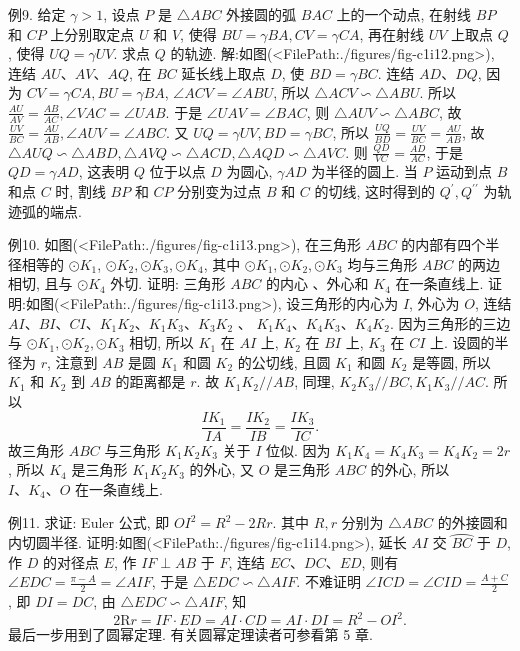 例9. 给定 $\gamma>1$, 设点 $P$ 是 $\triangle A B C$ 外接圆的弧 $B A C$ 上的一个动点, 在射线 $B P$ 和 $C P$ 上分别取定点 $U$ 和 $V$, 使得 $B U=\gamma B A, C V=\gamma C A$, 再在射线 $U V$ 上取点 $Q$, 使得 $U Q=\gamma U V$. 求点 $Q$ 的轨迹.
解:如图(<FilePath:./figures/fig-c1i12.png>), 连结 $A U 、 A V 、 A Q$, 在 $B C$ 延长线上取点 $D$, 使 $B D=\gamma B C$.
连结 $A D 、 D Q$, 因为 $C V=\gamma C A, B U=\gamma B A$, $\angle A C V=\angle A B U$, 所以 $\triangle A C V \backsim \triangle A B U$.
所以 $\frac{A U}{A V}=\frac{A B}{A C}, \angle V A C=\angle U A B$.
于是 $\angle U A V=\angle B A C$, 则 $\triangle A U V \backsim \triangle A B C$, 故 $\frac{U V}{B C}=\frac{A U}{A B}, \angle A U V=\angle A B C$.
又 $U Q=\gamma U V, B D=\gamma B C$, 所以 $\frac{U Q}{B D}=\frac{U V}{B C}= \frac{A U}{A B}$, 故 $\triangle A U Q \backsim \triangle A B D, \triangle A V Q \backsim \triangle A C D, \triangle A Q D \backsim \triangle A V C$.
则 $\frac{Q D}{V C}=\frac{A D}{A C}$, 于是 $Q D=\gamma A D$, 这表明 $Q$ 位于以点 $D$ 为圆心, $\gamma A D$ 为半径的圆上.
当 $P$ 运动到点 $B$ 和点 $C$ 时, 割线 $B P$ 和 $C P$ 分别变为过点 $B$ 和 $C$ 的切线, 这时得到的 $Q^{\prime}, Q^{\prime \prime}$ 为轨迹弧的端点.



例10. 如图(<FilePath:./figures/fig-c1i13.png>), 在三角形 $A B C$ 的内部有四个半径相等的 $\odot K_1$, $\odot K_2, \odot K_3, \odot K_4$, 其中 $\odot K_1, \odot K_2, \odot K_3$ 均与三角形 $A B C$ 的两边相切, 且与 $\odot K_4$ 外切.
证明: 三角形 $A B C$ 的内心 、外心和 $K_4$ 在一条直线上.
证明:如图(<FilePath:./figures/fig-c1i13.png>), 设三角形的内心为 $I$, 外心为 $O$, 连结 $A I 、 B I 、 C I 、 K_1 K_2 、 K_1 K_3 、 K_3 K_2$ 、 $K_1 K_4 、 K_4 K_3 、 K_4 K_2$.
因为三角形的三边与 $\odot K_1, \odot K_2, \odot K_3$ 相切, 所以 $K_1$ 在 $A I$ 上, $K_2$ 在 $B I$ 上, $K_3$ 在 $C I$ 上.
设圆的半径为 $r$, 注意到 $A B$ 是圆 $K_1$ 和圆 $K_2$ 的公切线, 且圆 $K_1$ 和圆 $K_2$ 是等圆, 所以 $K_1$ 和 $K_2$ 到 $A B$ 的距离都是 $r$.
故 $K_1 K_2 / / A B$, 同理, $K_2 K_3 / / B C, K_1 K_3 / / A C$.
所以
$$
\frac{I K_1}{I A}=\frac{I K_2}{I B}=\frac{I K_3}{I C} .
$$
故三角形 $A B C$ 与三角形 $K_1 K_2 K_3$ 关于 $I$ 位似.
因为 $K_1 K_4=K_4 K_3=K_4 K_2=2 r$, 所以 $K_4$ 是三角形 $K_1 K_2 K_3$ 的外心, 又 $O$ 是三角形 $A B C$ 的外心, 所以 $I 、 K_4 、 O$ 在一条直线上.



例11. 求证: Euler 公式, 即 $O I^2=R^2-2 R r$. 其中 $R, r$ 分别为 $\triangle A B C$ 的外接圆和内切圆半径.
证明:如图(<FilePath:./figures/fig-c1i14.png>), 延长 $A I$ 交 $\overparen{B C}$ 于 $D$, 作 $D$ 的对径点 $E$, 作 $I F \perp A B$ 于 $F$, 连结 $E C 、 D C 、 E D$, 则有 $\angle E D C=\frac{\pi-A}{2}=\angle A I F$, 于是 $\triangle E D C \backsim \triangle A I F$.
不难证明 $\angle I C D=\angle C I D=\frac{A+C}{2}$, 即 $D I= D C$, 由 $\triangle E D C \backsim \triangle A I F$, 知
$$
2 \mathrm{R} r=I F \cdot E D=A I \cdot C D=A I \cdot D I=R^2-O I^2 .
$$
最后一步用到了圆幂定理.
有关圆幂定理读者可参看第 5 章.



